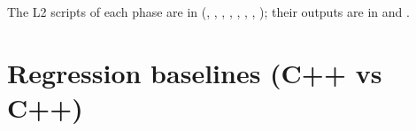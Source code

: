 The L2 scripts of each phase are in  (, , ,
, , , , ); their outputs are in
 and .

\section{\texorpdfstring{Regression baselines (C++ vs C++)}{Regression baselines (C++ vs C++)}}\label{translation_report-02u5fvalidation:26-regression-baselines-c-vs-c}
